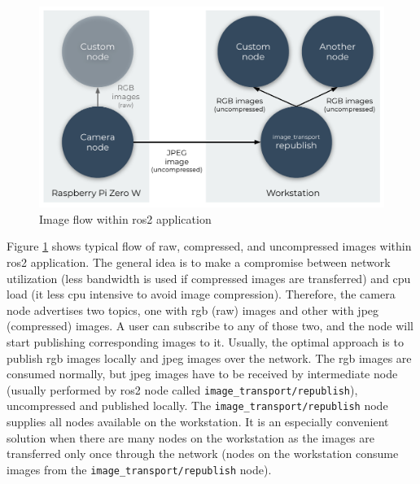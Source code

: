 \begin{figure}[H]
    \centering
    \includegraphics[width=1\textwidth]{physical/figures/camera_ros_images.pdf}
    \caption{Image flow within \ac{ros2} application}
    \label{fig:physical:camera_ros_images}
\end{figure}

Figure \ref{fig:physical:camera_ros_images} shows typical flow of raw, compressed, and uncompressed images within \ac{ros2} application.
The general idea is to make a compromise between network utilization (less bandwidth is used if compressed images are transferred) and \ac{cpu} load (it less \ac{cpu} intensive to avoid image compression).
Therefore, the camera node advertises two topics, one with \acs{rgb} (raw) images and other with \acs{jpeg} (compressed) images.
A user can subscribe to any of those two, and the node will start publishing corresponding images to it.
Usually, the optimal approach is to publish \ac{rgb} images locally and \acs{jpeg} images over the network.
The \ac{rgb} images are consumed normally, but \acs{jpeg} images have to be received by intermediate node (usually performed by \ac{ros2} node called \texttt{image\_transport/republish}), uncompressed and published locally.
The \texttt{image\_transport/republish} node supplies all nodes available on the workstation.
It is an especially convenient solution when there are many nodes on the workstation as the images are transferred only once through the network (nodes on the workstation consume images from the \texttt{image\_transport/republish} node).

 

